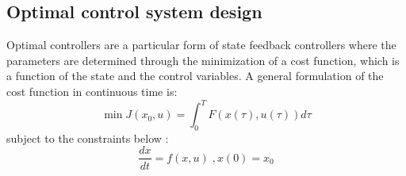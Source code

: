 \begin{table}[tbp]
    \caption{Summary of all the rider models presented  from the classical control approach, classified according to form of control, vehicle type and control task.}
\label{table1}
\end{table}
\subsection{Optimal control system design} \label{ch:optimal}

Optimal controllers are a particular form of state feedback controllers where the parameters are determined through the minimization of a  cost function, which is a function of the state and the control variables. A general formulation of the cost function in continuous time is:
\begin{equation*}
    \min J(x_0,u)=\int_{0}^{T} F(x(\tau), u(\tau))d\tau
\end{equation*}
subject to the constraints below :
\begin{equation*}
    \frac{dx}{dt}=f(x,u) \; ,x(0)=x_0
\end{equation*}

